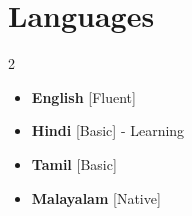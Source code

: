 \documentclass[11pt,a4paper,sans]{moderncv}
\makeatletter
\newcommand*{\customcvproject}[4][.25em]{
  \begin{tabular}{@{}l}
    {\bfseries #2}
  \end{tabular}
  \hfill
  \begin{tabular}{l@{}}
    {\itshape #3}
  \end{tabular}
  \ifx&#4&
  \else{\\
    \begin{minipage}{\maincolumnwidth}
      \small#4
  \end{minipage}}\fi
  \par\addvspace{#1}
}
\makeatother
\begin{document}



\section{Languages}
\begin{multicols}{2}
  \begin{itemize}[label=\textbullet]
    \item \textbf{English} [Fluent]
    \item {\textbf{Hindi} [Basic] - Learning}
    \item {\textbf{Tamil} [Basic]}
    \item {\textbf{Malayalam} [Native]}
  \end{itemize}
\end{multicols}
\end{document}
